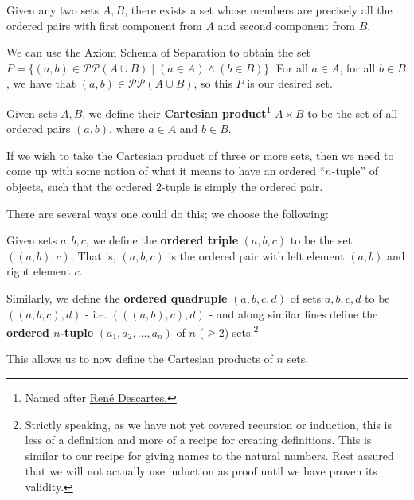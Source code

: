 \begin{thm}
\label{Thm:_Product_Sets_Exist}
Given any two sets $A, B$, there exists a set whose members are precisely all the ordered pairs with first component from $A$ and second component from $B$. 
\end{thm}

\begin{prf}
We can use the Axiom Schema of Separation to obtain the set $P = \{(a, b)\in\mathcal{P}\mathcal{P}(A\cup B)\mid (a\in A)\land (b\in B)\}$. For all $a\in A$, for all $b\in B$, we have that $(a, b)\in \mathcal{P}\mathcal{P}(A\cup B)$, so this $P$ is our desired set.
\end{prf}

\begin{defn}
\label{Defn:_Product_Sets}
Given sets $A, B$, we define their \textbf{Cartesian product}\footnote{Named after \hyperref[RDescartes]{Ren\'{e} Descartes.}} $A\times B$ to be the set of all ordered pairs $(a, b)$, where $a\in A$ and $b\in B$.
\end{defn}

If we wish to take the Cartesian product of three or more sets, then we need to come up with some notion of what it means to have an ordered \enquote{$n$-tuple} of objects, such that the ordered $2$-tuple is simply the ordered pair. 

There are several ways one could do this; we choose the following:

\begin{defn}
\label{Defn:_Ordered_n-tuples}
Given sets $a, b, c$, we define the \textbf{ordered triple} $(a, b, c)$ to be the set $((a, b), c)$. That is, $(a, b, c)$ is the ordered pair with left element $(a, b)$ and right element $c$. 

Similarly, we define the \textbf{ordered quadruple} $(a, b, c, d)$ of sets $a, b, c, d$ to be $((a, b, c), d)$ - i.e. $(((a, b), c), d)$ - and along similar lines define the \textbf{ordered $n$-tuple} $(a_1, a_2, \dots , a_n)$ of $n$ ($\geq 2$) sets.\footnote{Strictly speaking, as we have not yet covered recursion or induction, this is less of a definition and more of a recipe for creating definitions. This is similar to our recipe for giving names to the natural numbers. Rest assured that we will not actually use induction as proof until we have proven its validity.}
\end{defn}

This allows us to now define the Cartesian products of $n$ sets.

